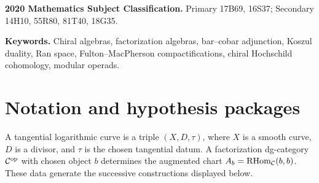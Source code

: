 \documentclass[11pt]{memoir}
\begin{document}
\begin{abstract}
The book therefore presents a tower of reconstruction theorems with
four coordinates attached to every claim: quadrant, presentation,
Beilinson level, and hypothesis package.  The local collision identity
and the classical bar--cobar resolution form the proved foundation.
The completed Ran, Verdier, modular, holographic, and
Calabi--Yau-to-chiral passages appear with the precise comparison data
that carry them.
\end{abstract}

\bigskip
\noindent
\textbf{2020 Mathematics Subject Classification.}
Primary 17B69, 16S37;
Secondary 14H10, 55R80, 81T40, 18G35.

\medskip
\noindent
\textbf{Keywords.}
Chiral algebras, factorization algebras, bar--cobar adjunction,
Koszul duality, Ran space, Fulton--MacPherson compactifications,
chiral Hochschild cohomology, modular operads.

\tableofcontents
\clearpage
\hypersetup{pageanchor=true}

\section*{Notation and hypothesis packages}
A tangential logarithmic curve is a triple $(X,D,\tau)$, where $X$ is
a smooth curve, $D$ is a divisor, and $\tau$ is the chosen tangential
datum.  A factorization dg-category $\mathcal{C}^{\mathrm{op}}$ with chosen
object $b$ determines the augmented chart
$A_b=\operatorname{RHom}_{\mathcal{C}}(b,b)$.  These data generate the
successive constructions displayed below.
\end{document}
